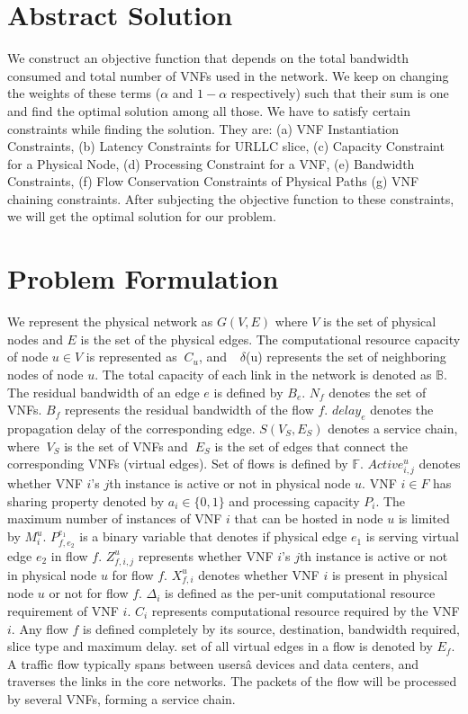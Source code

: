 \documentclass{article}
\begin{document}
\section{Abstract Solution}

We construct an objective function that depends on the total bandwidth consumed and total number of VNFs used in the network. We keep on changing the weights of these terms (\(\alpha\) and \(1-\alpha\) respectively) such that their sum is one and find the optimal solution among all those. We have to satisfy certain constraints while finding the solution. They are: (a) VNF Instantiation Constraints, (b) Latency Constraints for URLLC slice, (c) Capacity Constraint for a Physical Node, (d) Processing Constraint for a VNF, (e) Bandwidth Constraints,
(f) Flow Conservation Constraints of Physical Paths (g) VNF chaining constraints. After subjecting the objective function to these constraints, we will get the optimal solution for our problem.

\section{Problem Formulation}

We represent the physical network as \(G(V,E)\) where \(V\) is the set of physical nodes and \(E\) is the set of the physical edges. The computational resource capacity of node \(u \in V\) is represented as \(\ C_u\), and  \(\ \delta\)(u) represents the set of neighboring nodes of node \(u\). The total capacity of each link in the network is denoted as \(\mathbb{B}\). The residual bandwidth of an edge \(e\) is defined by \(B_e\). \(N_f\) denotes the set of VNFs. \(B_f\) represents the residual bandwidth of the flow \(f\). \(delay_e\) denotes the propagation delay of the corresponding edge. \(S(V_S, E_S)\) denotes a service chain, where \(\ V_S\) is the set of VNFs and \(\ E_S\) is the set of edges that connect the corresponding VNFs (virtual edges). Set of flows is defined by \(\mathbb{F}\). \(Active_{i,j}^u\) denotes whether VNF \(i\)'s \(j\)th instance is active or not in physical node \(u\). VNF \(i \in F\) has sharing property denoted by \(a_i \in \{0, 1\}\) and processing capacity \(P_i\). The maximum number of instances of VNF \(i\) that can be hosted in node \(u\) is limited by \(M_i^u\). \(P_{f,e_2}^{e_1}\) is a binary variable that denotes if physical edge \(e_1\) is serving virtual edge \(e_2\) in flow \(f\). \(Z_{f,i,j}^u\) represents whether VNF \(i\)'s \(j\)th instance is active or not in physical node \(u\) for flow \(f\). \(X_{f,i}^u\) denotes whether VNF \(i\) is present in physical node \(u\) or not for flow \(f\). \(\Delta_i\) is defined as the per-unit computational resource requirement of VNF \(i\). \(C_i\) represents computational resource required by the VNF \(i\). Any flow \(f\) is defined completely by its source, destination, bandwidth required, slice type and maximum delay. set of all virtual edges in a flow is denoted by \(E_f\). A traffic flow typically spans between usersâ devices and data centers, and traverses the links in the core networks. The packets of the flow will be processed by several VNFs, forming a service chain.
\end{document}
